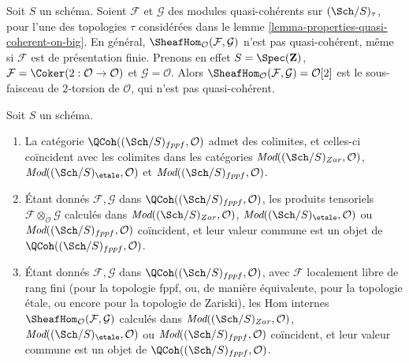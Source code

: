\begin{example}
\label{example-internal-hom-not-qcoh}
Soit $S$ un schéma. Soient $\mathcal{F}$ et $\mathcal{G}$ des modules
quasi-cohérents sur $(\Sch/S)_\tau$, pour l'une des topologies $\tau$
considérées dans le lemme \ref{lemma-properties-quasi-coherent-on-big}.
En général, $\SheafHom_\mathcal{O}(\mathcal{F}, \mathcal{G})$ n'est pas
quasi-cohérent, même si $\mathcal{F}$ est de présentation finie.
Prenons en effet $S = \Spec(\mathbf{Z})$,
$\mathcal{F} = \Coker(2 : \mathcal{O} \to \mathcal{O})$ et
$\mathcal{G} = \mathcal{O}$. Alors
$\SheafHom_\mathcal{O}(\mathcal{F}, \mathcal{G}) = \mathcal{O}[2]$
est le sous-faisceau de $2$-torsion de $\mathcal{O}$, qui n'est pas
quasi-cohérent.
\end{example}

\begin{lemma}
\label{lemma-qc-colimits}
Soit $S$ un schéma.
\begin{enumerate}
\item La catégorie $\QCoh((\Sch/S)_{fppf}, \mathcal{O})$ admet des
colimites, et celles-ci coïncident avec les colimites dans les catégories
$\textit{Mod}((\Sch/S)_{Zar}, \mathcal{O})$,
$\textit{Mod}((\Sch/S)_\etale, \mathcal{O})$ et
$\textit{Mod}((\Sch/S)_{fppf}, \mathcal{O})$.
\item Étant donnés $\mathcal{F}, \mathcal{G}$ dans
$\QCoh((\Sch/S)_{fppf}, \mathcal{O})$, les produits tensoriels
$\mathcal{F} \otimes_\mathcal{O} \mathcal{G}$ calculés dans
$\textit{Mod}((\Sch/S)_{Zar}, \mathcal{O})$,
$\textit{Mod}((\Sch/S)_\etale, \mathcal{O})$ ou
$\textit{Mod}((\Sch/S)_{fppf}, \mathcal{O})$ coïncident, et leur valeur
commune est un objet de $\QCoh((\Sch/S)_{fppf}, \mathcal{O})$.
\item Étant donnés $\mathcal{F}, \mathcal{G}$ dans
$\QCoh((\Sch/S)_{fppf}, \mathcal{O})$, avec $\mathcal{F}$ localement libre
de rang fini (pour la topologie fppf, ou, de manière équivalente, pour la
topologie \'etale, ou encore pour la topologie de Zariski), les Hom internes
$\SheafHom_\mathcal{O}(\mathcal{F}, \mathcal{G})$ calculés dans
$\textit{Mod}((\Sch/S)_{Zar}, \mathcal{O})$,
$\textit{Mod}((\Sch/S)_\etale, \mathcal{O})$ ou
$\textit{Mod}((\Sch/S)_{fppf}, \mathcal{O})$ coïncident, et leur valeur
commune est un objet de $\QCoh((\Sch/S)_{fppf}, \mathcal{O})$.
\end{enumerate}
\end{lemma}

